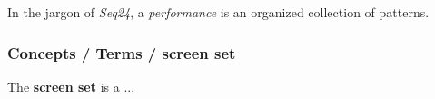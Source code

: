    In the jargon of \textsl{Seq24}, a
   \textsl{performance} is an organized collection of patterns.

\subsubsection{Concepts / Terms / screen set}
\label{subsubsec:concepts_terms_screen_set}

   The \textbf{screen set}
   is a ...


